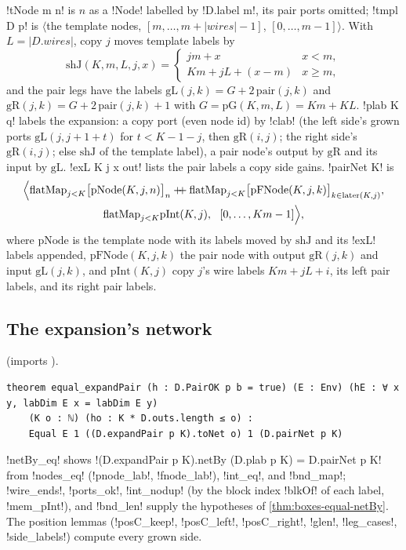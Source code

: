 {\begin{definition}\label{def:boxes-pairNet}
\lbx!tNode m n! is $n$ as a \lbx!Node! labelled by \lbx!D.label m!, its pair ports omitted; \lbx!tmpl D p! is $\langle$the template nodes, $[m,\ldots,m+|\mathit{wires}|-1]$, $[0,\ldots,m-1]\rangle$. With $L=|D.\mathit{wires}|$, copy $j$ moves template labels by
\[
\mathrm{shJ}(K,m,L,j,x)=\begin{cases} jm+x & x<m,\\ Km+jL+(x-m) & x\ge m,\end{cases}
\]
and the pair legs have the labels $\mathrm{gL}(j,k)=G+2\,\mathrm{pair}(j,k)$ and $\mathrm{gR}(j,k)=G+2\,\mathrm{pair}(j,k)+1$ with $G=\mathrm{pG}(K,m,L)=Km+KL$. \lbx!plab K q! labels the expansion: a copy port (even node id) by \lbx!clab! (the left side's grown ports $\mathrm{gL}(j,j+1+t)$ for $t<K-1-j$, then $\mathrm{gR}(i,j)$; the right side's $\mathrm{gR}(i,j)$; else $\mathrm{shJ}$ of the template label), a pair node's output by $\mathrm{gR}$ and its input by $\mathrm{gL}$. \lbx!exL K j x out! lists the pair labels a copy side gains. \lbx!pairNet K! is
\begin{multline*}
\Bigl\langle \mathrm{flatMap}_{j<K}\bigl[\mathrm{pNode}(K,j,n)\bigr]_{n}\mathbin{+\!\!+}\mathrm{flatMap}_{j<K}\bigl[\mathrm{pFNode}(K,j,k)\bigr]_{k\in\mathrm{later}(K,j)},\\
\mathrm{flatMap}_{j<K}\mathrm{pInt}(K,j),\ \ [0,\ldots,Km-1]\Bigr\rangle,
\end{multline*}
where $\mathrm{pNode}$ is the template node with its labels moved by $\mathrm{shJ}$ and its \lbx!exL! labels appended, $\mathrm{pFNode}(K,j,k)$ the pair node with output $\mathrm{gR}(j,k)$ and input $\mathrm{gL}(j,k)$, and $\mathrm{pInt}(K,j)$ copy $j$'s wire labels $Km+jL+i$, its left pair labels, and its right pair labels.
\end{definition}

\subsection{The expansion's network}

 (imports ).

\begin{theorem}\label{thm:boxes-equal-expandPair}
\begin{lstlisting}[style=leanbox]
theorem equal_expandPair (h : D.PairOK p b = true) (E : Env) (hE : ∀ x y, labDim E x = labDim E y)
    (K o : ℕ) (ho : K * D.outs.length ≤ o) :
    Equal E 1 ((D.expandPair p K).toNet o) 1 (D.pairNet p K)
\end{lstlisting}
\end{theorem}
\noindent \lbx!netBy_eq! shows \lbx!(D.expandPair p K).netBy (D.plab p K) = D.pairNet p K! from \lbx!nodes_eq! (\lbx!pnode_lab!, \lbx!fnode_lab!), \lbx!int_eq!, and \lbx!bnd_map!; \lbx!wire_ends!, \lbx!ports_ok!, \lbx!int_nodup! (by the block index \lbx!blkOf! of each label, \lbx!mem_pInt!), and \lbx!bnd_len! supply the hypotheses of \cref{thm:boxes-equal-netBy}. The position lemmas (\lbx!posC_keep!, \lbx!posC_left!, \lbx!posC_right!, \lbx!glen!, \lbx!leg_cases!, \lbx!side_labels!) compute every grown side.

}
